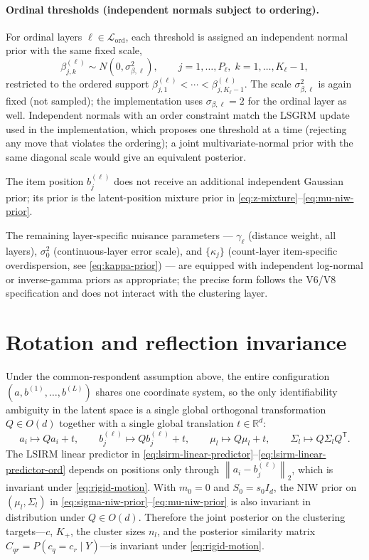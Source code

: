 \documentclass[11pt]{article}
\newcommand{\R}{\mathbb R}
\newcommand{\norm}[1]{\left\lVert #1 \right\rVert}
\newcommand{\trans}{^{\mathsf T}}
\begin{document}
\paragraph{Ordinal thresholds (independent normals subject to ordering).}
For ordinal layers $\ell\in\mathcal L_{\mathrm{ord}}$, each threshold is
assigned an independent normal prior with the same fixed scale,
\begin{equation}
    \beta_{j,k}^{(\ell)}\sim N(0,\sigma_{\beta,\ell}^2),
    \qquad j=1,\dots,P_\ell,\;k=1,\dots,K_\ell-1,
    \label{eq:beta-thr-prior}
\end{equation}
restricted to the ordered support
$\beta_{j,1}^{(\ell)}<\cdots<\beta_{j,K_\ell-1}^{(\ell)}$.  The scale
$\sigma_{\beta,\ell}^2$ is again fixed (not sampled); the implementation uses
$\sigma_{\beta,\ell}=2$ for the ordinal layer as well.  Independent normals
with an order constraint match the LSGRM update used in the implementation,
which proposes one threshold at a time (rejecting any move that violates the
ordering); a joint multivariate-normal prior with the same diagonal scale
would give an equivalent posterior.

The item position $b_j^{(\ell)}$ does not receive an additional independent
Gaussian prior; its prior is the latent-position mixture prior in
\eqref{eq:z-mixture}--\eqref{eq:mu-niw-prior}.

The remaining layer-specific nuisance parameters --- $\gamma_\ell$ (distance
weight, all layers), $\sigma_0^2$ (continuous-layer error scale), and
$\{\kappa_j\}$ (count-layer item-specific overdispersion, see
\eqref{eq:kappa-prior}) --- are equipped with independent log-normal or
inverse-gamma priors as appropriate; the precise form follows the V6/V8
specification and does not interact with the clustering layer.

\section{Rotation and reflection invariance}
\label{sec:layer-comparability}

Under the common-respondent assumption above, the entire configuration
$(a,b^{(1)},\dots,b^{(L)})$ shares one coordinate system, so the only
identifiability ambiguity in the latent space is a single global orthogonal
transformation $Q\in O(d)$ together with a single global translation
$t\in\R^d$:
\begin{equation}
    a_i\mapsto Qa_i+t,
    \qquad
    b_j^{(\ell)}\mapsto Qb_j^{(\ell)}+t,
    \qquad
    \mu_l\mapsto Q\mu_l+t,
    \qquad
    \Sigma_l\mapsto Q\Sigma_l Q\trans.
    \label{eq:rigid-motion}
\end{equation}
The LSIRM linear predictor in
\eqref{eq:lsirm-linear-predictor}--\eqref{eq:lsirm-linear-predictor-ord}
depends on positions only through $\norm{a_i-b_j^{(\ell)}}_2$, which is
invariant under \eqref{eq:rigid-motion}.  With $m_0=0$ and $S_0=s_0 I_d$, the
NIW prior on $(\mu_l,\Sigma_l)$ in
\eqref{eq:sigma-niw-prior}--\eqref{eq:mu-niw-prior} is also invariant in
distribution under $Q\in O(d)$.  Therefore the joint posterior on the
clustering targets---$c$, $K_+$, the cluster sizes $n_l$, and the posterior
similarity matrix $C_{qr}=P(c_q=c_r\mid Y)$---is invariant under
\eqref{eq:rigid-motion}.
\end{document}
